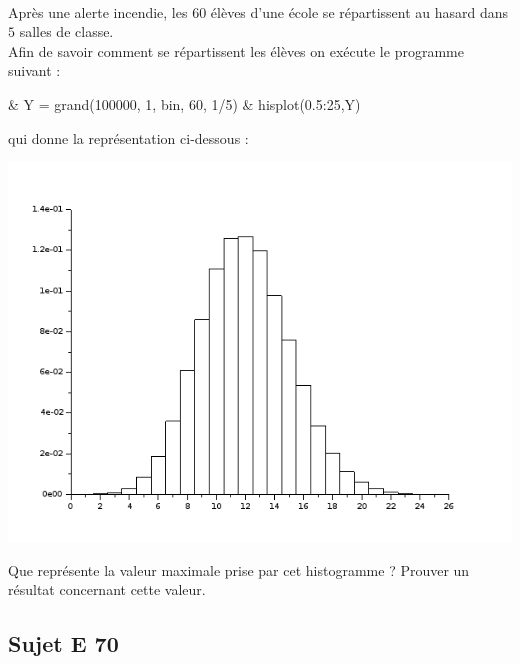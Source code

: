 \documentclass[11pt]{article}%
\begin{document}
\begin{exerciceSP}~\\
  Après une alerte incendie, les $60$ élèves d'une école se
  répartissent au hasard dans $5$ salles de classe.\\
  Afin de savoir comment se répartissent les élèves on exécute le
  programme \Scilab{} suivant :

  \begin{scilab}
    & Y = grand(100000, 1, \ttq{}bin\ttq{}, 60, 1/5) \nl %
    & hisplot(0.5:25,Y) \nl %
  \end{scilab}
  qui donne la représentation ci-dessous :

  \begin{center}
    \includegraphics[scale=0.5]{Figures/Exo_incendie.png}
  \end{center}
  Que représente la valeur maximale prise par cet histogramme ?
  Prouver un résultat concernant cette valeur.
\end{exerciceSP}



\subsection*{Sujet E 70}

\end{document}
